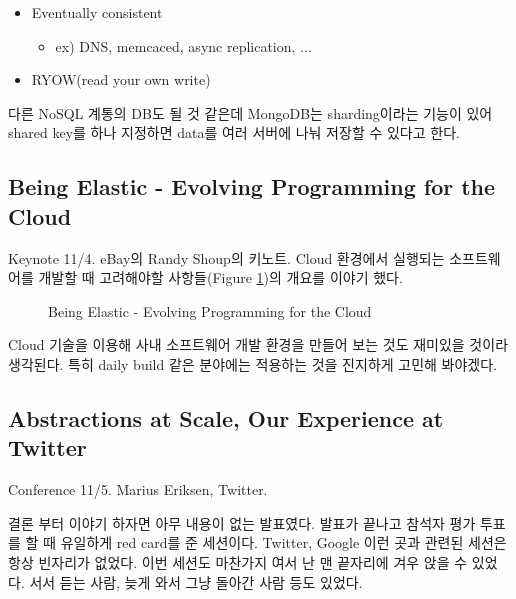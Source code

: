 \documentclass[11pt]{article}
\begin{document}
\begin{itemize}
\item Eventually consistent
    \begin{itemize}
    \item ex) DNS, memcaced, async replication, ...
    \end{itemize}
\item RYOW(read your own write)
\end{itemize}
 
다른 NoSQL 계통의 DB도 될 것 같은데 MongoDB는 sharding이라는 기능이
있어 shared key를 하나 지정하면 data를 여러 서버에 나눠 저장할 수
있다고 한다.

\subsection{Being Elastic - Evolving Programming for the Cloud}

Keynote 11/4. eBay의 Randy Shoup의 키노트.
Cloud 환경에서 실행되는 소프트웨어를 개발할 때
고려해야할 사항들(Figure \ref{cloud})의 개요를 이야기 했다.


\begin{figure}[t]
    \begin{Frame}
        \begin{center}
        \end{center}
    \end{Frame}
    \caption{Being Elastic - Evolving Programming for the Cloud}
    \label{cloud}
\end{figure}

Cloud 기술을 이용해 사내 소프트웨어 개발 환경을 만들어 보는 것도 재미있을 
것이라 생각된다. 특히 daily build 같은 분야에는 적용하는 것을 진지하게 
고민해 봐야겠다.

\subsection{Abstractions at Scale, Our Experience at Twitter}

Conference 11/5. Marius Eriksen, Twitter.

결론 부터 이야기 하자면 아무 내용이 없는 발표였다. 발표가 끝나고 참석자 평가 
투표를 할 때 유일하게 red card를 준 세션이다. 
Twitter, Google 이런 곳과 관련된 세션은 항상 빈자리가 없었다. 
이번 세션도 마찬가지 여서 난 맨 끝자리에 겨우 앉을 수 있었다. 서서 듣는
사람, 늦게 와서 그냥 돌아간 사람 등도 있었다.
 
\end{document}
